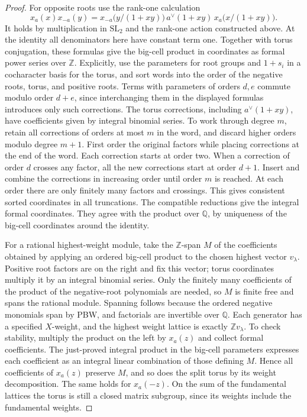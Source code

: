 \documentclass[11pt,a4paper,openany,oneside]{book}
\theoremstyle{resultstyle}
\theoremstyle{definition}
\numberwithin{equation}{chapter}
\newcommand{\SL}{\mathrm{SL}}
\newcommand{\ZZ}{\mathbb{Z}}
\newcommand{\QQ}{\mathbb{Q}}
\begin{document}
\begin{proof}
For opposite roots use the rank-one calculation
\[
 x_a(x)x_{-a}(y)
 =
 x_{-a}\bigl(y/(1+xy)\bigr)\,
 a^\vee(1+xy)\,
 x_a\bigl(x/(1+xy)\bigr).
\]
It holds by multiplication in \(\SL_2\) and the
rank-one action constructed above. At the identity
all denominators here have constant term one.
Together with torus conjugation, these formulas
give the big-cell product in coordinates as formal
power series over \(\ZZ\). Explicitly, use the
parameters for root groups and \(1+s_i\) in a
cocharacter basis for the torus, and sort words
into the order of the negative roots, torus, and
positive roots. Terms with parameters of orders
\(d,e\) commute modulo order \(d+e\), since
interchanging them in the displayed formulas
introduces only such corrections. The torus
corrections, including \(a^\vee(1+xy)\), have
coefficients given by integral binomial series.
To work through degree \(m\), retain all corrections of
orders at most \(m\) in the word, and discard higher
orders modulo degree \(m+1\). First order the original
factors while placing corrections at the end of the
word. Each correction starts at order two. When a
correction of order \(d\) crosses any factor, all the
new corrections start at order \(d+1\). Insert and
combine the corrections in increasing order until
order \(m\) is reached. At each order there are only
finitely many factors and crossings. This gives
consistent sorted coordinates in all truncations.
The compatible reductions give the integral
formal coordinates. They agree with the product
over \(\QQ\), by uniqueness of the big-cell
coordinates around the identity.

For a rational highest-weight module, take the
\(\ZZ\)-span \(M\) of the coefficients obtained by
applying an ordered big-cell product to the
chosen highest vector \(v_\lambda\).
Positive root factors are on the right and fix
this vector; torus coordinates multiply it by
an integral binomial series. Only the finitely
many coefficients of the product of the
negative-root polynomials are needed, so \(M\)
is finite free and spans the rational module.
Spanning follows because the ordered negative
monomials span by PBW, and factorials are
invertible over \(\QQ\). Each generator has
a specified \(X\)-weight, and the highest
weight lattice is exactly \(\ZZ v_\lambda\).
To check stability, multiply the product on
the left by \(x_a(z)\) and collect formal
coefficients. The just-proved integral product
in the big-cell parameters expresses each
coefficient as an integral linear combination
of those defining \(M\). Hence all coefficients
of \(x_a(z)\) preserve \(M\), and so does the
split torus by its weight decomposition. The
same holds for \(x_a(-z)\). On the sum of the
fundamental lattices the torus is still a closed
matrix subgroup, since its weights include the
fundamental weights.


\end{proof}
\end{document}
